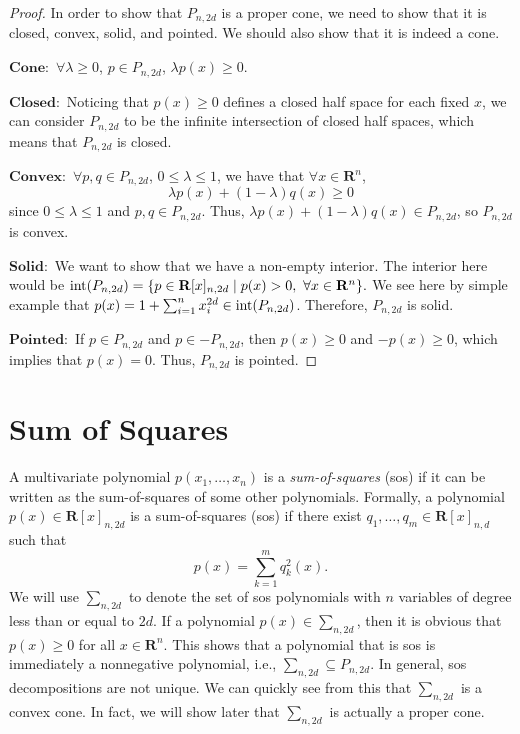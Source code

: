 	\begin{proof}
		In order to show that $P_{n, 2d}$ is a proper cone, we need to show that it is closed, convex, solid, and pointed. We should also show that it is indeed a cone.
		
		$\mathbf{Cone: }$ $\forall \lambda \geq 0$, $p \in P_{n,2d}$, $\lambda p(x) \geq 0$. 
		
		$\mathbf{Closed: }$ Noticing that $p(x) \geq 0$ defines a closed half space for each fixed $x$, we can consider $P_{n, 2d}$ to be the infinite intersection of closed half spaces, which means that $P_{n, 2d}$ is closed. 
		
		$\mathbf{Convex: }$ $\forall p, q \in P_{n, 2d}$, $0 \leq \lambda \leq 1$, we have that $\forall x \in \mathbf{R}^n$, 
		$$
		\lambda p(x) + (1-\lambda) q(x) \geq 0
		$$
		since $0 \leq \lambda \leq 1$ and $p, q \in P_{n, 2d}$. Thus, $\lambda p(x) + (1- \lambda) q(x) \in P_{n, 2d}$, so $P_{n, 2d}$ is convex. 
		
		$\mathbf{Solid: }$ We want to show that we have a non-empty interior. The interior here would be $\textnormal{int}(P_{n, 2d}) = \{p \in \mathbf{R}[x]_{n, 2d} \mid p(x) > 0, \textnormal{ } \forall x \in \mathbf{R}^n\}.$ We see here by simple example that $p(x) = 1 + \sum_{i=1}^{n} x_{i}^{2d} \in \textnormal{int}(P_{n,2d})$. Therefore, $P_{n, 2d}$ is solid.
		
		$\mathbf{Pointed: }$ If $p \in P_{n, 2d}$ and $p \in -P_{n, 2d}$, then $p(x) \geq 0$ and $-p(x) \geq 0$, which implies that $p(x) = 0$. Thus, $P_{n, 2d}$ is pointed.
	\end{proof}
	
	\section{Sum of Squares}
	
	A multivariate polynomial $p(x_1, \dots, x_n)$ is a \emph{sum-of-squares} (sos) if it can be written as the sum-of-squares of some other polynomials. Formally, a polynomial $p(x) \in \mathbf{R}[x]_{n, 2d}$ is a sum-of-squares (sos) if there exist $q_1, \dots, q_m \in \mathbf{R}[x]_{n,d}$ such that 
	\begin{equation} \label{sos}
		p(x) = \sum_{k=1}^{m} q_k^2(x). 
	\end{equation}
	We will use $\sum_{n, 2d}$ to denote the set of sos polynomials with $n$ variables of degree less than or equal to $2d$. If a polynomial $p(x) \in \sum_{n, 2d}$, then it is obvious that $p(x) \geq 0$ for all $x \in \mathbf{R}^n$. This shows that a polynomial that is sos is immediately a nonnegative polynomial, i.e., $\sum_{n, 2d} \subseteq P_{n,2d}$. In general, sos decompositions are not unique. We can quickly see from this that $\sum_{n, 2d}$ is a convex cone. In fact, we will show later that $\sum_{n, 2d}$ is actually a proper cone.
	
